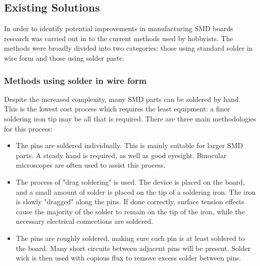 
\subsection{Existing Solutions}
In order to identify potential improvements in manufacturing SMD boards
research was carried out in to the current methods used by hobbyists.
The methods were broadly divided into two categories: those using standard
solder in wire form and those using solder paste. %

\subsubsection{Methods using solder in wire form}
Despite the increased complexity, many SMD parts can be soldered by hand.
This is the lowest cost process which requires the least equipment: a
finer soldering iron tip may be all that is required. There are three 
main methodologies for this process:

\begin{itemize}
	\item	The pins are soldered individually. This is mainly suitable for larger SMD parts. A steady hand is required, as well as good eyesight.
			Binocular microscopes are often used to assist this process.
	\item	The process of "drag soldering" is used. The device is placed on the board, and a small amount of solder is placed on the tip of a soldering iron.
			The iron is slowly "dragged" along the pins. If done correctly, surface tension effects cause the majority of the solder to remain on the tip of the iron,
			while the necessary electrical connections are soldered.
	\item	The pins are roughly soldered, making sure each pin is at least soldered to the board. Many short circuits between adjacent pins will be present. Solder wick
			is then used with copious flux to remove excess solder between pins.
\end{itemize}

